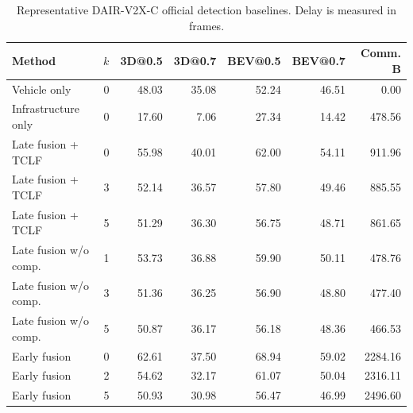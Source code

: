 \begin{table}[t]
\centering
\scriptsize
\caption{Representative DAIR-V2X-C official detection baselines. Delay is measured in frames.}
\label{tab:dair-official-baselines}
\begin{tabular}{lrrrrrr}
\toprule
Method & $k$ & 3D@0.5 & 3D@0.7 & BEV@0.5 & BEV@0.7 & Comm. B \\
\midrule
Vehicle only & 0 & 48.03 & 35.08 & 52.24 & 46.51 & 0.00 \\
Infrastructure only & 0 & 17.60 & 7.06 & 27.34 & 14.42 & 478.56 \\
Late fusion + TCLF & 0 & 55.98 & 40.01 & 62.00 & 54.11 & 911.96 \\
Late fusion + TCLF & 3 & 52.14 & 36.57 & 57.80 & 49.46 & 885.55 \\
Late fusion + TCLF & 5 & 51.29 & 36.30 & 56.75 & 48.71 & 861.65 \\
Late fusion w/o comp. & 1 & 53.73 & 36.88 & 59.90 & 50.11 & 478.76 \\
Late fusion w/o comp. & 3 & 51.36 & 36.25 & 56.90 & 48.80 & 477.40 \\
Late fusion w/o comp. & 5 & 50.87 & 36.17 & 56.18 & 48.36 & 466.53 \\
Early fusion & 0 & 62.61 & 37.50 & 68.94 & 59.02 & 2284.16 \\
Early fusion & 2 & 54.62 & 32.17 & 61.07 & 50.04 & 2316.11 \\
Early fusion & 5 & 50.93 & 30.98 & 56.47 & 46.99 & 2496.60 \\
\bottomrule
\end{tabular}
\end{table}
